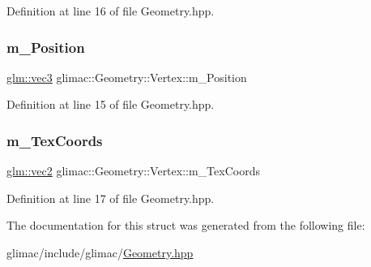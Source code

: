 Definition at line 16 of file Geometry.\+hpp.

\mbox{\label{structglimac_1_1_geometry_1_1_vertex_a94d0358d5cd9963f2565fdb7f28ee3b8}} 
\subsubsection{\texorpdfstring{m\+\_\+\+Position}{m\_Position}}
{\footnotesize\ttfamily \hyperlink{group__core__types_ga1c47e8b3386109bc992b6c48e91b0be7}{glm\+::vec3} glimac\+::\+Geometry\+::\+Vertex\+::m\+\_\+\+Position}



Definition at line 15 of file Geometry.\+hpp.

\mbox{\label{structglimac_1_1_geometry_1_1_vertex_ab5633b199c86e43426871f1dfc163af3}} 
\subsubsection{\texorpdfstring{m\+\_\+\+Tex\+Coords}{m\_TexCoords}}
{\footnotesize\ttfamily \hyperlink{group__core__types_gaa1618f51db67eaa145db101d8c8431d8}{glm\+::vec2} glimac\+::\+Geometry\+::\+Vertex\+::m\+\_\+\+Tex\+Coords}



Definition at line 17 of file Geometry.\+hpp.



The documentation for this struct was generated from the following file\+:\begin{DoxyCompactItemize}
\item 
glimac/include/glimac/\hyperlink{_geometry_8hpp}{Geometry.\+hpp}\end{DoxyCompactItemize}
